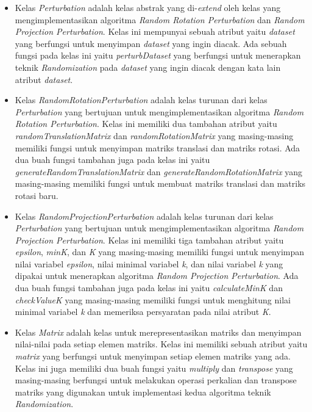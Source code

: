 \begin{itemize}
    \item Kelas \textit{Perturbation} adalah kelas abstrak yang di-\textit{extend} oleh kelas yang mengimplementasikan algoritma \textit{Random Rotation Perturbation} dan \textit{Random Projection Perturbation}. Kelas ini mempunyai sebuah atribut yaitu \textit{\textit{dataset}} yang berfungsi untuk menyimpan \textit{dataset} yang ingin diacak. Ada sebuah fungsi pada kelas ini yaitu \textit{perturbDataset} yang berfungsi untuk menerapkan teknik \textit{Randomization} pada \textit{dataset} yang ingin diacak dengan kata lain atribut \textit{\textit{dataset}}.
    \item Kelas \textit{RandomRotationPerturbation} adalah kelas turunan dari kelas \textit{Perturbation} yang bertujuan untuk mengimplementasikan algoritma \textit{Random Rotation Perturbation}. Kelas ini memiliki dua tambahan atribut yaitu \textit{randomTranslationMatrix} dan \textit{randomRotationMatrix} yang masing-masing memiliki fungsi untuk menyimpan matriks translasi dan matriks rotasi. Ada dua buah fungsi tambahan juga pada kelas ini yaitu \textit{generateRandomTranslationMatrix} dan \textit{generateRandomRotationMatrix} yang masing-masing memiliki fungsi untuk membuat matriks translasi dan matriks rotasi baru.
    \item Kelas \textit{RandomProjectionPerturbation} adalah kelas turunan dari kelas \textit{Perturbation} yang bertujuan untuk mengimplementasikan algoritma \textit{Random Projection Perturbation}. Kelas ini memiliki tiga tambahan atribut yaitu \textit{epsilon}, \textit{minK}, dan \textit{K} yang masing-masing memiliki fungsi untuk menyimpan nilai variabel \textit{epsilon}, nilai minimal variabel \textit{k}, dan nilai variabel \textit{k} yang dipakai untuk menerapkan algoritma \textit{Random Projection Perturbation}. Ada dua buah fungsi tambahan juga pada kelas ini yaitu \textit{calculateMinK} dan \textit{checkValueK} yang masing-masing memiliki fungsi untuk menghitung nilai minimal variabel \textit{k} dan memeriksa persyaratan pada nilai atribut \textit{K}.
    \item Kelas \textit{Matrix} adalah kelas untuk merepresentasikan matriks dan menyimpan nilai-nilai pada setiap elemen matriks. Kelas ini memiliki sebuah atribut yaitu \textit{matrix} yang berfungsi untuk menyimpan setiap elemen matriks yang ada. Kelas ini juga memiliki dua buah fungsi yaitu \textit{multiply} dan \textit{transpose} yang masing-masing berfungsi untuk melakukan operasi perkalian dan transpose matriks yang digunakan untuk implementasi kedua algoritma teknik \textit{Randomization}.

\end{itemize}
